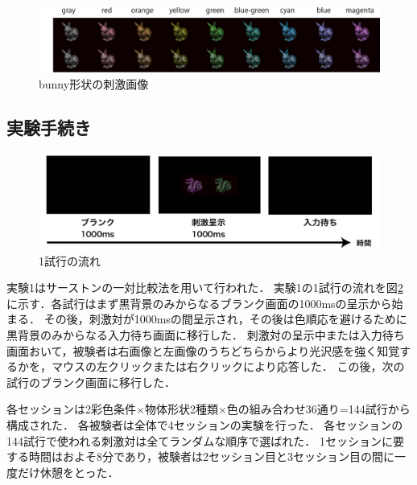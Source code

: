             \begin{figure}[h]
                \centering
                \includegraphics[width=14.0cm]{./img/ex1_stimuli_b_p.png}
                \caption{bunny形状の刺激画像}
                \label{ex1_stimuli_b}
            \end{figure}

        \subsection{実験手続き}

            \begin{figure}[h]
                \centering
                \includegraphics[width=14.0cm]{./img/ex1_procedure.png}
                \caption{1試行の流れ}
                \label{ex1_procedure}
            \end{figure}

            実験1はサーストンの一対比較法を用いて行われた．
            実験1の1試行の流れを図\ref{ex1_procedure}に示す．各試行はまず黒背景のみからなるブランク画面の1000msの呈示から始まる．
            その後，刺激対が1000msの間呈示され，その後は色順応を避けるために黒背景のみからなる入力待ち画面に移行した．
            刺激対の呈示中または入力待ち画面おいて，被験者は右画像と左画像のうちどちらからより光沢感を強く知覚するかを，マウスの左クリックまたは右クリックにより応答した．
            この後，次の試行のブランク画面に移行した．

            各セッションは2彩色条件$\times$物体形状2種類$\times$色の組み合わせ36通り=144試行から構成された．
            各被験者は全体で4セッションの実験を行った．
            各セッションの144試行で使われる刺激対は全てランダムな順序で選ばれた．
            1セッションに要する時間はおよそ8分であり，被験者は2セッション目と3セッション目の間に一度だけ休憩をとった．



